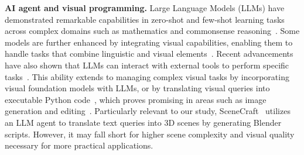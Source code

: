 \noindent\textbf{AI agent and visual programming.}
Large Language Models (LLMs) have demonstrated remarkable capabilities in zero-shot and few-shot learning tasks across complex domains such as mathematics and commonsense reasoning~\cite{brown2020language, ouyang2022training, achiam2023gpt, touvron2023llama, dubey2024llama, team2023gemini}.
%
Some models are further enhanced by integrating visual capabilities, enabling them to handle tasks that combine linguistic and visual elements~\cite{alayrac2022flamingo, li2023blip, achiam2023gpt, liu2023llava}. Recent advancements have also shown that LLMs can interact with external tools to perform specific tasks~\cite{schick2023toolformer, wang2024internvid, shen2024hugginggpt, wangvoyager}. This ability extends to managing complex visual tasks by incorporating visual foundation models with LLMs,  or by translating visual queries into executable Python code~\cite{wu2023visual, gupta2023visual, suris2023vipergpt}, which proves promising in areas such as image generation and editing~\cite{sharma2024vision, lian2024llmgrounded, wu2024self, feng2024layoutgpt, wang2024genartist, yang2024mastering}. Particularly relevant to our study, SceneCraft~\cite{hu2024scenecraft} utilizes an LLM agent to translate text queries into 3D scenes by generating Blender scripts. However, it may fall short for higher scene complexity and visual quality necessary for more practical applications.


